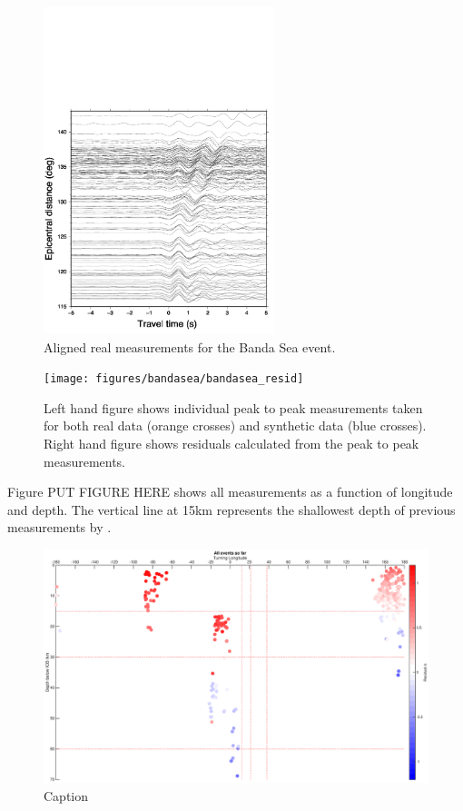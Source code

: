 \documentclass[11pt,a4paper]{article}
\begin{document}
\begin{figure}
	\centering
	\includegraphics[width=0.6\textwidth]{figures/bandasea/bandasea_real_aligned}
	\caption{Aligned real measurements for the Banda Sea event.}
	\label{fig:Bandasea real aligned}
\end{figure}

\begin{figure}
	\centering
	\texttt{[image: figures/bandasea/bandasea\_resid]}
	\caption{Left hand figure shows individual peak to peak measurements taken for both real data (orange crosses) and synthetic data (blue crosses). Right hand figure shows residuals calculated from the peak to peak measurements.}
	\label{fig:Bandasea residuals}
\end{figure}

Figure PUT FIGURE HERE shows all measurements as a function of longitude and depth. The vertical line at 15km represents the shallowest depth of previous measurements by \cite{Waszek2011a}.

\begin{figure}
	\centering
	\includegraphics[width=\textwidth]{figures/all_longitude}
	\caption{Caption}
	\label{fig:All longitude}
\end{figure}
\end{document}
